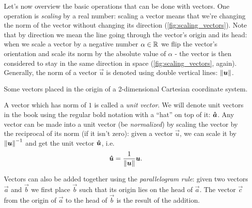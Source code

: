 Let's now overview the basic operations that can be done with vectors. One operation is \textit{scaling} by a real number: scaling a vector means that we're changing the norm of the vector without changing its direction (\cref{fig:scaling_vectors}). Note that by direction we mean the line going through the vector's origin and its head: when we scale a vector by a negative number $\alpha\in\mathbb{R}^{}$ we flip the vector's orientation and scale its norm by the absolute value of $\alpha$ - the vector is then considered to stay in the same direction in space (\cref{fig:scaling_vectors}, again). Generally, the norm of a vector $\vec{u}$ is denoted using double vertical lines: $\left\| \bm{u} \right\|$.

\begin{marginfigure}
    \caption{Some vectors placed in the origin of a 2-dimensional Cartesian coordinate system.}
    \label{fig:scaling_vectors}
\end{marginfigure}

A vector which has norm of $1$ is called a \textit{unit vector}. We will denote unit vectors in the book using the regular bold notation with a \enquote{hat} on top of it: $\bm{\hat{a}}$. Any vector can be made into a unit vector (be \textit{normalized}) by scaling the vector by the reciprocal of its norm (if it isn't zero): given a vector $\vec{u}$, we can scale it by $\left\| \bm{u} \right\|^{-1}$ and get the unit vector $\bm{\hat{u}}$, i.e.
\begin{equation}
    \bm{\hat{u}} = \frac{1}{\left\| \bm{u} \right\|}\bm{u}.
    \label{eq:label}
\end{equation}

Vectors can also be added together using the \textit{parallelogram rule}: given two vectors $\vec{a}$ and $\vec{b}$ we first place $\vec{b}$ such that its origin lies on the head of $\vec{a}$. The vector $\vec{c}$ from the origin of $\vec{a}$ to the head of $\vec{b}$ is the result of the addition.
